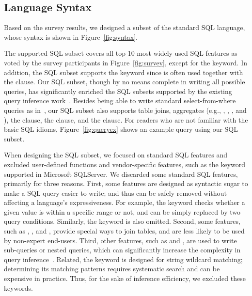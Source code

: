 \vspace{-1mm}
\subsection{Language Syntax}
\label{sec:syntax}
\vspace{-1mm}

Based on the survey results, we designed a subset
of the standard SQL language, whose
syntax is shown in Figure~\ref{fig:syntax}.


The supported SQL subset covers all top 10 most widely-used SQL
features as voted by the survey participants
in Figure~\ref{fig:survey}, except for the  keyword.
In addition, the SQL subset supports the 
keyword since  is often used together with the  clause.
Our SQL subset, though by no means complete in writing all
possible queries, has significantly
enriched the SQL subsets supported by the existing query inference
work~\cite{DasSarma:2010, Tran:2009}. Besides being able to write
standard select-from-where queries as in~\cite{DasSarma:2010, Tran:2009},
our SQL subset also supports table joins, aggregates
(e.g., , , , and ),
the  clause, the  clause,
and the  clause. For readers who are not
familiar with the basic SQL idioms, Figure~\ref{fig:queryex}
shows an example query using our SQL subset.


When designing the SQL subset, we focused on standard
SQL features and excluded user-defined functions and
vendor-specific features, such as the 
keyword supported in Microsoft SQLServer. 
We discarded some standard SQL features, primarily for
three reasons. First, some features are designed
as syntactic sugar to make a SQL query easier to write;
and thus can be safely removed without affecting a language's
expressiveness. For example, the 
keyword checks whether a given value is within a specific
range or not, and can be simply replaced by two query conditions.
Similarly, the  keyword is also omitted.
Second, some features, such as 
, , and ,
provide special ways to join tables, and are less likely to be
used by non-expert end-users.
Third, other features, such as  and ,
are used to write sub-queries or nested queries, 
which can significantly increase the complexity in query inference~\cite{DasSarma:2010}.
Related, the  keyword is designed for string
wildcard matching; determining its matching
patterns requires systematic search and can be
expensive in practice. Thus, 
for the sake of inference efficiency, we excluded these keywords.

